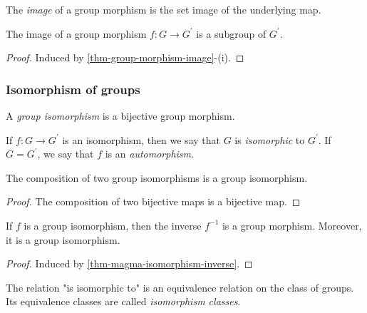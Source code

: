 \documentclass[12pt]{report}
\begin{document}
\begin{definition} \label{def-group-morphism-image}
    The \emph{image} of a group morphism is the set image of the underlying map.
\end{definition}

\begin{proposition} \label{prop-group-morphism-image-subgroup}
    The image of a group morphism $f \colon G \to G^{\prime}$ is a subgroup of $G^{\prime}$.
\end{proposition}

\begin{proof}
    Induced by \ref{thm-group-morphism-image}-(i).
\end{proof}

\subsubsection{Isomorphism of groups}

\begin{definition} \label{def-group-isomorphism}
    A \emph{group isomorphism} is a bijective group morphism.
\end{definition}

\begin{notation}
    If $f \colon G \to G^{\prime}$ is an isomorphism, then we say that $G$ is \emph{isomorphic} to $G^{\prime}$. If $G = G^{\prime}$, we say that $f$ is an \emph{automorphism}.
\end{notation}

\begin{theorem} \label{thm-group-isomorphism-composition}
    The composition of two group isomorphisms is a group isomorphism.
\end{theorem}

\begin{proof}
    The composition of two bijective maps is a bijective map.
\end{proof}

\begin{theorem} \label{thm-group-isomorphism-inverse}
    If $f$ is a group isomorphism, then the inverse $f^{-1}$ is a group morphism. Moreover, it is a group isomorphism.
\end{theorem}

\begin{proof}
    Induced by \ref{thm-magma-isomorphism-inverse}.
\end{proof}

\begin{proposition}
    The relation "is isomorphic to" is an equivalence relation on the class of groups. Its equivalence classes are called \emph{isomorphism classes}.
\end{proposition}
\end{document}
